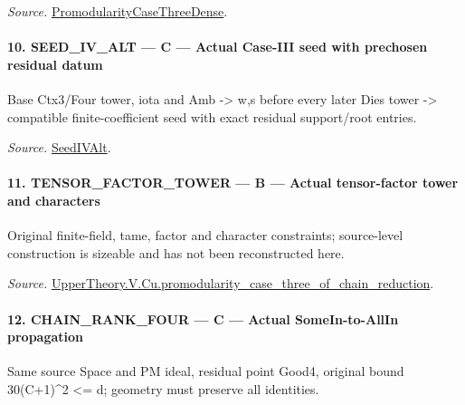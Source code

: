\documentclass[11pt,a4paper]{article}
\numberwithin{equation}{section}
\theoremstyle{remark}\newtheorem{remark}[theorem]{Remark}
\begin{document}
\emph{Source.} \href{https://github.com/CocoSgt/riemann-hypothesis-lean/blob/7cbf7a0c32fca1badf05931879a37c3f8a2b03b4/src/Development/AutomorphicArithmetic/AutomorphicVarieties/ModularityArgument/ThresholdArguments/DenseThresholdCases/PromodularityCaseThree.lean#L40-L42}{PromodularityCaseThreeDense}.



\paragraph{10. SEED\_\allowbreak IV\_\allowbreak ALT — C — Actual Case-III seed with prechosen residual datum}

Base Ctx3/Four tower, iota and Amb -> w,s before every later Dies tower -> compatible finite-coefficient seed with exact residual support/root entries.

\emph{Source.} \href{https://github.com/CocoSgt/riemann-hypothesis-lean/blob/7cbf7a0c32fca1badf05931879a37c3f8a2b03b4/src/Development/AutomorphicArithmetic/AutomorphicVarieties/ModularityArgument/ThresholdArguments/DenseThresholdCases/PromodularityCaseThree.lean#L19-L25}{SeedIVAlt}.



\paragraph{11. TENSOR\_\allowbreak FACTOR\_\allowbreak TOWER — B — Actual tensor-factor tower and characters}

Original finite-field, tame, factor and character constraints; source-level construction is sizeable and has not been reconstructed here.

\emph{Source.} \href{https://github.com/CocoSgt/riemann-hypothesis-lean/blob/7cbf7a0c32fca1badf05931879a37c3f8a2b03b4/src/Development/AutomorphicArithmetic/AutomorphicVarieties/ModularityArgument/ThresholdArguments/DenseThresholdCases/PromodularityCaseThreeOfLemmas.lean#L131-L153}{UpperTheory.V.Cu.promodularity\_\allowbreak case\_\allowbreak three\_\allowbreak of\_\allowbreak chain\_\allowbreak reduction}.



\paragraph{12. CHAIN\_\allowbreak RANK\_\allowbreak FOUR — C — Actual SomeIn-to-AllIn propagation}

Same source Space and PM ideal, residual point Good4, original bound 30(C+1)\textasciicircum{}2 <= d; geometry must preserve all identities.
\end{document}
